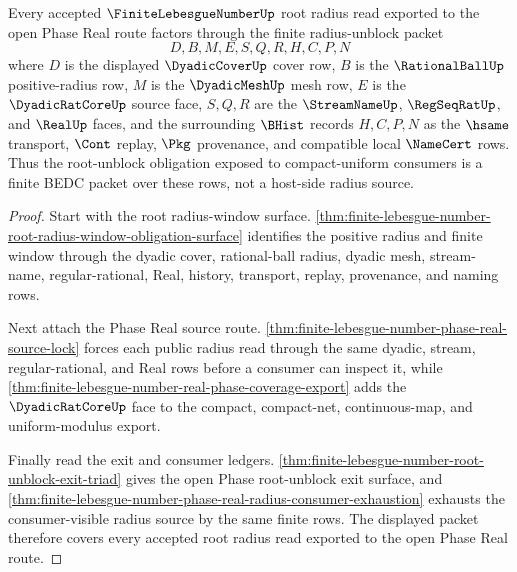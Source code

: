 \begin{theorem}
\label{thm:finite-lebesgue-number-open-phase-root-unblock-radius-coverage}
Every accepted $\FiniteLebesgueNumberUp$ root radius read exported to the open Phase Real route factors through the finite radius-unblock packet
$$
D,B,M,E,S,Q,R,H,C,P,N
$$
where $D$ is the displayed $\DyadicCoverUp$ cover row, $B$ is the $\RationalBallUp$ positive-radius row, $M$ is the $\DyadicMeshUp$ mesh row, $E$ is the $\DyadicRatCoreUp$ source face, $S,Q,R$ are the $\StreamNameUp$, $\RegSeqRatUp$, and $\RealUp$ faces, and the surrounding $\BHist$ records $H,C,P,N$ as the $\hsame$ transport, $\Cont$ replay, $\Pkg$ provenance, and compatible local $\NameCert$ rows. Thus the root-unblock obligation exposed to compact-uniform consumers is a finite BEDC packet over these rows, not a host-side radius source.
\end{theorem}
\begin{proof}
Start with the root radius-window surface. \autoref{thm:finite-lebesgue-number-root-radius-window-obligation-surface} identifies the positive radius and finite window through the dyadic cover, rational-ball radius, dyadic mesh, stream-name, regular-rational, Real, history, transport, replay, provenance, and naming rows.

Next attach the Phase Real source route. \autoref{thm:finite-lebesgue-number-phase-real-source-lock} forces each public radius read through the same dyadic, stream, regular-rational, and Real rows before a consumer can inspect it, while \autoref{thm:finite-lebesgue-number-real-phase-coverage-export} adds the $\DyadicRatCoreUp$ face to the compact, compact-net, continuous-map, and uniform-modulus export.

Finally read the exit and consumer ledgers. \autoref{thm:finite-lebesgue-number-root-unblock-exit-triad} gives the open Phase root-unblock exit surface, and \autoref{thm:finite-lebesgue-number-phase-real-radius-consumer-exhaustion} exhausts the consumer-visible radius source by the same finite rows. The displayed packet therefore covers every accepted root radius read exported to the open Phase Real route.
\end{proof}

